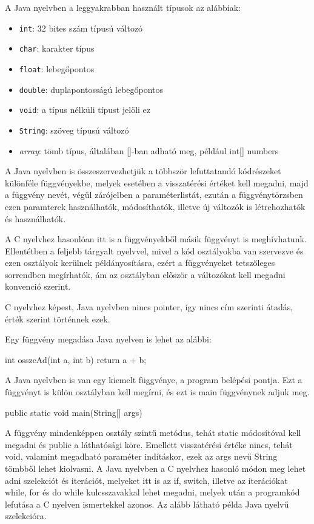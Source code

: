 A Java nyelvben a leggyakrabban használt típusok az alábbiak:
\begin{itemize}
\item \texttt{int}: 32 bites szám típusú változó
\item \texttt{char}: karakter típus
\item \texttt{float}: lebegőpontos 
\item \texttt{double}: duplapontosságú lebegőpontos
\item \texttt{void}: a típus nélküli típust jelöli ez
\item \texttt{String}: szöveg típusú változó
\item \textit{array}: tömb típus, általában []-ban adható meg, például int[] numbers
\end{itemize}

A Java nyelvben is összeszervezhetjük a többször lefuttatandó kódrészeket különféle függvényekbe, melyek esetében a visszatérési értéket kell megadni, majd a függvény nevét, végül zárójelben a paraméterlistát, ezután a függvénytörzsben ezen paramterek használhatók, módosíthatók, illetve új változók is létrehozhatók és használhatók.

A C nyelvhez hasonlóan itt is a függvényekből másik függvényt is meghívhatunk. Ellentétben a feljebb tárgyalt nyelvvel, mivel a kód osztályokba van szervezve és ezen osztályok kerülnek példányosításra, ezért a függvényeket tetszőleges sorrendben megírhatók, ám az osztályban először a változókat kell megadni konvenció szerint.

C nyelvhez képest, Java nyelvben nincs pointer, így nincs cím szerinti átadás, érték szerint történnek ezek.

Egy függvény megadása Java nyelven is lehet az alábbi:
\begin{java}
int osszeAd(int a, int b) {
	return a + b;
}
\end{java}

A Java nyelvben is van egy kiemelt függvénye, a program belépési pontja. Ezt a függvényt is külön osztályban kell megírni, és ezt is main függvénynek adjuk meg.
\begin{java}
public static void main(String[] args) {
}
\end{java}

A függvény mindenképpen osztály szintű metódus, tehát static módosítóval kell megadni és public a láthatósági köre. Emellett visszatérési értéke nincs, tehát void, valamint megadható paraméter indításkor, ezek az args nevű String tömbből lehet kiolvasni.
A Java nyelvben a C nyelvhez hasonló módon meg lehet adni szelekciót és iterációt, melyeket itt is az if, switch, illetve az iterációkat while, for és do while kulcsszavakkal lehet megadni, melyek után a programkód lefutása a C nyelven ismertekkel azonos. Az alább látható példa Java nyelvű szelekcióra.

